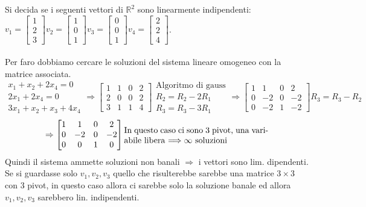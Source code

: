 \begin{example}
Si decida se i seguenti vettori di $\mathbb{R}^2$ sono linearmente indipendenti:\\
$v_1 = \begin{bmatrix}1\\2\\3\end{bmatrix}$\hspace{.5cm}$v_2 = \begin{bmatrix}1\\0\\1\end{bmatrix}$\hspace{.5cm}$v_3 = \begin{bmatrix}0\\0\\1\end{bmatrix}$\hspace{.5cm}$v_4 = \begin{bmatrix}2\\2\\4\end{bmatrix}$.\\\\
Per faro dobbiamo cercare le soluzioni del sistema lineare omogeneo con la matrice associata.
\[
\begin{array}{l}
    x_1 + x_2 + 2x_4 = 0\\
    2x_1 + 2x_4 = 0\\
    3x_1 + x_2 + x_3 + 4x_4
\end{array}
\Rightarrow
\begin{bmatrix}
1 & 1 & 0 & 2\\
2 & 0 & 0 & 2\\
3 & 1 & 1 & 4
\end{bmatrix}
\begin{array}{l}
\text{Algoritmo di gauss}\\
R_2 = R_2 - 2R_1\\
R_3 = R_3 - 3R_1
\end{array}
\Rightarrow
\begin{bmatrix}
1 & 1 & 0 & 2\\
0 & -2 & 0 & -2\\
0 & -2 & 1 & -2
\end{bmatrix}
R_3 = R_3 - R_2
\]
\[
\Rightarrow
\begin{bmatrix}
1 & 1 & 0 & 2\\
0 & -2 & 0 & -2\\
0 & 0 & 1 & 0
\end{bmatrix}
\parbox{6cm}{In questo caso ci sono 3 pivot, una variabile libera $\Longrightarrow \infty$ soluzioni}
\]
Quindi il sistema ammette soluzioni non banali $\Longrightarrow$ i vettori sono lim. dipendenti.\\ 
Se si guardasse solo $v_1, v_2, v_3$ quello che risulterebbe sarebbe una matrice $3 \times 3$ con 3 pivot, in questo caso allora ci sarebbe solo la soluzione banale ed allora $v_1, v_2, v_3$ sarebbero lin. indipendenti.
\end{example}

